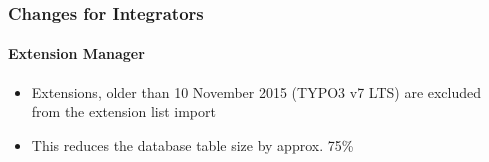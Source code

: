 
\begin{frame}[fragile]
	\frametitle{Changes for Integrators}
	\framesubtitle{Extension Manager}

	\begin{itemize}
		\item Extensions, older than 10 November 2015 (TYPO3 v7 LTS) are excluded
			from the extension list import
		\item This reduces the database table size by approx. 75\%
	\end{itemize}

\end{frame}

